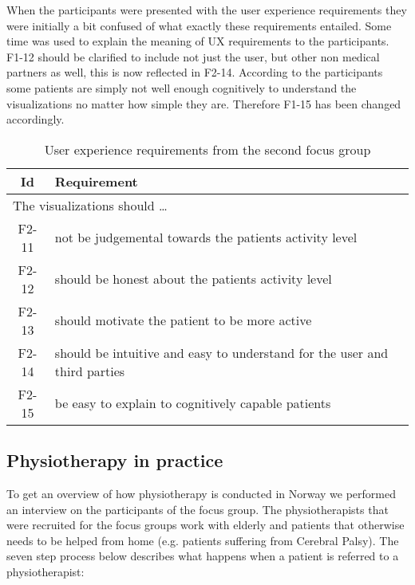 When the participants were presented with the user experience requirements they were initially a bit confused of what exactly these requirements entailed. Some time was used to explain the meaning of UX requirements to the participants. F1-12 should be clarified to include not just the user, but other non medical partners as well, this is now reflected in F2-14. According to the participants some patients are simply not well enough cognitively to understand the visualizations no matter how simple they are. Therefore F1-15 has been changed accordingly.

\begin{table}[h!]
  \begin{center}
  \begin{tabular}{|c|p{12cm}|}
    \hline
      \textbf{Id} & \textbf{Requirement} \\ \hline
    \multicolumn{2}{|l|}{The visualizations should \ldots} \\ \hline
      F2-11 & not be judgemental towards the patients activity level \\ \hline
      F2-12 & should be honest about the patients activity level \\ \hline
      F2-13 & should motivate the patient to be more active \\ \hline
      F2-14 & should be intuitive and easy to understand for the user and third parties \\ \hline
      F2-15 & be easy to explain to cognitively capable patients \\ \hline
      
  \end{tabular}
  \end{center}
  \caption{User experience requirements from the second focus group}
\end{table}

\subsection{Physiotherapy in practice} 
To get an overview of how physiotherapy is conducted in Norway we performed an interview on the participants of the focus group. The physiotherapists that were recruited for the focus groups work with elderly and patients that otherwise needs to be helped from home (e.g. patients suffering from Cerebral Palsy). The seven step process below describes what happens when a patient is referred to a physiotherapist:

